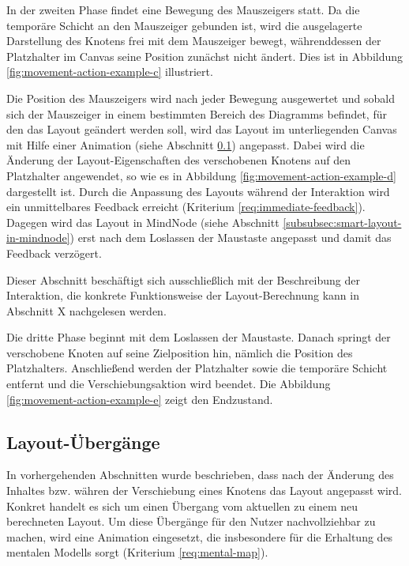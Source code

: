 In der zweiten Phase findet eine Bewegung des Mauszeigers statt. Da die temporäre Schicht an den Mauszeiger gebunden ist, wird die ausgelagerte Darstellung des Knotens frei mit dem Mauszeiger bewegt, währenddessen der Platzhalter im Canvas seine Position zunächst nicht ändert. Dies ist in Abbildung \ref{fig:movement-action-example-c} illustriert.

Die Position des Mauszeigers wird nach jeder Bewegung ausgewertet und sobald sich der Mauszeiger in einem bestimmten Bereich des Diagramms befindet, für den das Layout geändert werden soll, wird das Layout im unterliegenden Canvas mit Hilfe einer Animation (siehe Abschnitt \ref{subsec:layout-transition}) angepasst. Dabei wird die Änderung der Layout-Eigenschaften des verschobenen Knotens auf den Platzhalter angewendet, so wie es in Abbildung \ref{fig:movement-action-example-d} dargestellt ist. Durch die Anpassung des Layouts während der Interaktion wird ein unmittelbares Feedback erreicht (Kriterium \ref{req:immediate-feedback}). Dagegen wird das Layout in MindNode (siehe Abschnitt \ref{subsubsec:smart-layout-in-mindnode}) erst nach dem Loslassen der Maustaste angepasst und damit das Feedback verzögert.

Dieser Abschnitt beschäftigt sich ausschließlich mit der Beschreibung der Interaktion, die konkrete Funktionsweise der Layout-Berechnung kann in Abschnitt X nachgelesen werden.

Die dritte Phase beginnt mit dem Loslassen der Maustaste. Danach springt der verschobene Knoten auf seine Zielposition hin, nämlich die Position des Platzhalters. Anschließend werden der Platzhalter sowie die temporäre Schicht entfernt und die Verschiebungsaktion wird beendet. Die Abbildung \ref{fig:movement-action-example-e} zeigt den Endzustand.

\subsection{Layout-Übergänge}
\label{subsec:layout-transition}

In vorhergehenden Abschnitten wurde beschrieben, dass nach der Änderung des Inhaltes bzw. währen der Verschiebung eines Knotens das Layout angepasst wird. Konkret handelt es sich um einen Übergang vom aktuellen zu einem neu berechneten Layout. Um diese Übergänge für den Nutzer nachvollziehbar zu machen, wird eine Animation eingesetzt, die insbesondere für die Erhaltung des mentalen Modells sorgt (Kriterium \ref{req:mental-map}).

